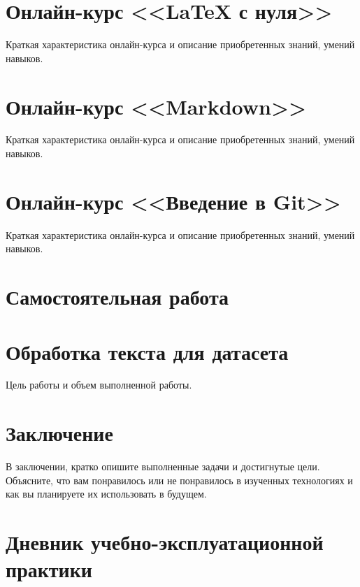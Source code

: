 \documentclass[12pt]{article}
\begin{document}
\section{Онлайн-курс <<LaTeX с нуля>>}

Краткая характеристика онлайн-курса и описание приобретенных знаний, умений навыков.


\section{Онлайн-курс <<Markdown>>}

Краткая характеристика онлайн-курса и описание приобретенных знаний, умений навыков.


\section{Онлайн-курс <<Введение в Git>>}

Краткая характеристика онлайн-курса и описание приобретенных знаний, умений навыков.


\section{Самостоятельная работа}



\section{Обработка текста для датасета}

Цель работы и объем выполненной работы.


\section*{Заключение}

В заключении, кратко опишите выполненные задачи и достигнутые цели. Объясните, что вам понравилось или не понравилось в изученных технологиях и как вы планируете их использовать в будущем.


\newpage \section*{Дневник учебно-эксплуатационной практики}
\end{document}
